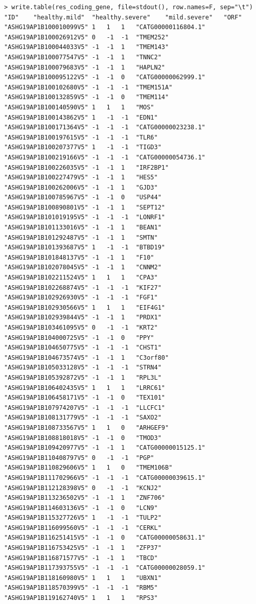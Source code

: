 \documentclass[en,black,12pt,normal]{elegantnote}
\begin{document}
\begin{lstlisting}
> write.table(res_coding_gene, file=stdout(), row.names=F, sep="\t")
"ID"	"healthy.mild"	"healthy.severe"	"mild.severe"	"ORF"
"ASHG19AP1B100010099V5"	1	1	1	"CATG00000116804.1"
"ASHG19AP1B100026912V5"	0	-1	-1	"TMEM252"
"ASHG19AP1B100044033V5"	-1	-1	1	"TMEM143"
"ASHG19AP1B100077547V5"	-1	-1	1	"TNNC2"
"ASHG19AP1B100079683V5"	-1	-1	1	"HAPLN2"
"ASHG19AP1B100095122V5"	-1	-1	0	"CATG00000062999.1"
"ASHG19AP1B100102680V5"	-1	-1	-1	"TMEM151A"
"ASHG19AP1B100132859V5"	-1	-1	0	"TMEM114"
"ASHG19AP1B100140590V5"	1	1	1	"MOS"
"ASHG19AP1B100143862V5"	1	-1	-1	"EDN1"
"ASHG19AP1B100171364V5"	-1	-1	-1	"CATG00000023238.1"
"ASHG19AP1B100197615V5"	-1	-1	-1	"TLR6"
"ASHG19AP1B100207377V5"	1	-1	-1	"TIGD3"
"ASHG19AP1B100219166V5"	-1	-1	-1	"CATG00000054736.1"
"ASHG19AP1B100226035V5"	-1	-1	1	"IRF2BP1"
"ASHG19AP1B100227479V5"	-1	-1	1	"HES5"
"ASHG19AP1B100262006V5"	-1	-1	1	"GJD3"
"ASHG19AP1B100785967V5"	-1	-1	0	"USP44"
"ASHG19AP1B100890801V5"	-1	-1	1	"SEPT12"
"ASHG19AP1B101019195V5"	-1	-1	-1	"LONRF1"
"ASHG19AP1B101133016V5"	-1	-1	1	"BEAN1"
"ASHG19AP1B101292487V5"	-1	-1	1	"SMTN"
"ASHG19AP1B101393687V5"	1	-1	-1	"BTBD19"
"ASHG19AP1B101848137V5"	-1	-1	1	"F10"
"ASHG19AP1B102078045V5"	-1	-1	1	"CNNM2"
"ASHG19AP1B102211524V5"	1	1	1	"CPA3"
"ASHG19AP1B102268874V5"	-1	-1	-1	"KIF27"
"ASHG19AP1B102926930V5"	-1	-1	-1	"FGF1"
"ASHG19AP1B102930566V5"	1	1	1	"EIF4G1"
"ASHG19AP1B102939844V5"	-1	-1	1	"PRDX1"
"ASHG19AP1B103461095V5"	0	-1	-1	"KRT2"
"ASHG19AP1B104000725V5"	-1	-1	0	"PPY"
"ASHG19AP1B104650775V5"	-1	-1	-1	"CHST1"
"ASHG19AP1B104673574V5"	-1	-1	1	"C3orf80"
"ASHG19AP1B105033128V5"	-1	-1	-1	"STRN4"
"ASHG19AP1B105392872V5"	-1	-1	1	"RPL3L"
"ASHG19AP1B106402435V5"	1	1	1	"LRRC61"
"ASHG19AP1B106458171V5"	-1	-1	0	"TEX101"
"ASHG19AP1B107974207V5"	-1	-1	-1	"LLCFC1"
"ASHG19AP1B108131779V5"	-1	-1	-1	"SAXO2"
"ASHG19AP1B108733567V5"	1	1	0	"ARHGEF9"
"ASHG19AP1B108818018V5"	-1	-1	0	"TMOD3"
"ASHG19AP1B109420977V5"	-1	-1	1	"CATG00000015125.1"
"ASHG19AP1B110408797V5"	0	-1	-1	"PGP"
"ASHG19AP1B110829606V5"	1	1	0	"TMEM106B"
"ASHG19AP1B111702966V5"	-1	-1	-1	"CATG00000039615.1"
"ASHG19AP1B112128398V5"	0	-1	-1	"KCNJ2"
"ASHG19AP1B113236502V5"	-1	-1	1	"ZNF706"
"ASHG19AP1B114603136V5"	-1	-1	0	"LCN9"
"ASHG19AP1B115327726V5"	1	-1	-1	"TULP2"
"ASHG19AP1B116099560V5"	-1	-1	-1	"CERKL"
"ASHG19AP1B116251415V5"	-1	-1	0	"CATG00000058631.1"
"ASHG19AP1B116753425V5"	-1	-1	1	"ZFP37"
"ASHG19AP1B116871577V5"	-1	-1	1	"TBCD"
"ASHG19AP1B117393755V5"	-1	-1	-1	"CATG00000028059.1"
"ASHG19AP1B118160980V5"	1	1	1	"UBXN1"
"ASHG19AP1B118570399V5"	-1	-1	-1	"RBM5"
"ASHG19AP1B119162740V5"	1	1	1	"RPS3"

\end{lstlisting}
\end{document}
